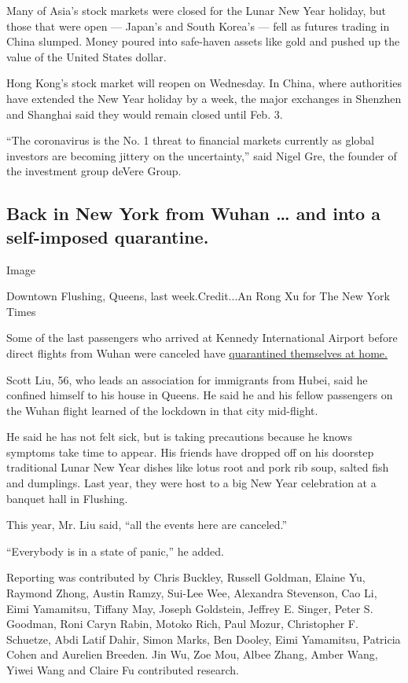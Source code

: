 Many of Asia's stock markets were closed for the Lunar New Year holiday,
but those that were open --- Japan's and South Korea's --- fell as
futures trading in China slumped. Money poured into safe-haven assets
like gold and pushed up the value of the United States dollar.

Hong Kong's stock market will reopen on Wednesday. In China, where
authorities have extended the New Year holiday by a week, the major
exchanges in Shenzhen and Shanghai said they would remain closed until
Feb. 3.

``The coronavirus is the No. 1 threat to financial markets currently as
global investors are becoming jittery on the uncertainty,'' said Nigel
Gre, the founder of the investment group deVere Group.

\hypertarget{back-in-new-york-from-wuhan--and-into-a-self-imposed-quarantine}{%
\subsection{Back in New York from Wuhan \ldots{} and into a self-imposed
quarantine.}\label{back-in-new-york-from-wuhan--and-into-a-self-imposed-quarantine}}

Image

Downtown Flushing, Queens, last week.Credit...An Rong Xu for The New
York Times

Some of the last passengers who arrived at Kennedy International Airport
before direct flights from Wuhan were canceled have
\href{https://www.nytimes.com/2020/01/27/nyregion/new-york-city-coronavirus.html}{quarantined
themselves at home.}

Scott Liu, 56, who leads an association for immigrants from Hubei, said
he confined himself to his house in Queens. He said he and his fellow
passengers on the Wuhan flight learned of the lockdown in that city
mid-flight.

He said he has not felt sick, but is taking precautions because he knows
symptoms take time to appear. His friends have dropped off on his
doorstep traditional Lunar New Year dishes like lotus root and pork rib
soup, salted fish and dumplings. Last year, they were host to a big New
Year celebration at a banquet hall in Flushing.

This year, Mr. Liu said, ``all the events here are canceled.''

``Everybody is in a state of panic,'' he added.

Reporting was contributed by Chris Buckley, Russell Goldman, Elaine Yu,
Raymond Zhong, Austin Ramzy, Sui-Lee Wee, Alexandra Stevenson, Cao Li,
Eimi Yamamitsu, Tiffany May, Joseph Goldstein, Jeffrey E. Singer, Peter
S. Goodman, Roni Caryn Rabin, Motoko Rich, Paul Mozur, Christopher F.
Schuetze, Abdi Latif Dahir, Simon Marks, Ben Dooley, Eimi Yamamitsu,
Patricia Cohen and Aurelien Breeden. Jin Wu, Zoe Mou, Albee Zhang, Amber
Wang, Yiwei Wang and Claire Fu contributed research.

